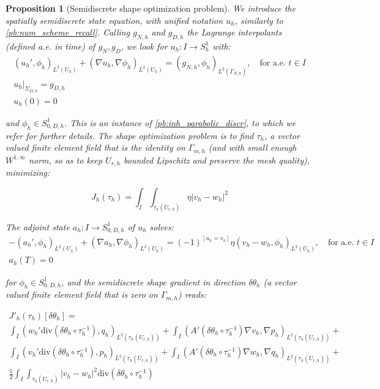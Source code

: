 \documentclass[english,a4paper,9pt,oneside]{scrbook}	%
\theoremstyle{break}
\newtheorem{prop}[equation]{Proposition}
\theoremstyle{remark}
\newcommand{\te}{\theta}
\newcommand{\dive}{\text{div}}
\begin{document}
\begin{prop}[Semidiscrete shape optimization problem]
\label{prop:sd_shopt}
We introduce the spatially semidiscrete state equation, with unified notation $u_h$, similarly to \cref{pb:num_scheme_recall}. Calling $g_{N,h}$ and $g_{D,h}$ the Lagrange interpolants (defined a.e. in time) of $g_N, g_D$, we look for $u_h:I \rightarrow S^1_h$ with:
\begin{align*}
\left ( u_h', \phi_h\right)_{L^2(U_h)} + (\nabla u_h, \nabla \phi_h)_{L^2(U_h)} = (g_{N,h} , \phi_h)_{L^2(\Gamma_{N,h})}, \quad \text{for a.e. } t \in I\\
u_h|_{\Sigma_{D,h}}=g_{D,h}\\
u_h(0)=0
\end{align*}

and $\phi_h \in S^1_{0,D,h}$. This is an instance of \cref{pb:inh_parabolic_discr}, to which we refer for further details. The shape optimization problem is to find $\tau_h$, a vector valued finite element field that is the identity on $\Gamma_{m,h}$ (and with small enough $W^{1,\infty}$ norm, so as to keep $U_{r,h}$ bounded Lipschitz and preserve the mesh quality), minimizing:

$$J_h(\tau_h)=\int_I\int_{\tau_h(U_{r,h})}\eta |v_h-w_h|^2$$

The adjoint state $a_h:I \rightarrow  S^1_{0,D,h}$ of $u_h$ solves:
\begin{align*}
-\left ( a_h', \phi_h\right)_{L^2(U_h)} + (\nabla a_h, \nabla \phi_h)_{L^2(U_h)} = (-1)^{\left [ u_h=v_h\right ]}\eta(v_h-w_h, \phi_h)_{L^2(U_h)}, \quad \text{for a.e. } t \in I\\
a_h(T)=0
\end{align*}

for $\phi_h \in S^1_{0,D,h}$, and the semidiscrete shape gradient in direction $\delta \te_h$ (a vector valued finite element field that is zero on $\Gamma_{m,h}$) reads:

\begin{align*} 
	J'_h(\tau_h)[\delta \te_h] =\\ \int_I (w_h' \dive(\delta \te_h\circ  \tau_h^{-1}), q_h )_{L^2(\tau_h(U_{r,h}))}+ \int_I (A'(\delta\te_h \circ \tau_h^{-1})\nabla v_h, \nabla p_h)_{L^2(\tau_h(U_{r,h}))}+\\
\int_I (v_h' \dive(\delta \te_h\circ  \tau_h^{-1}), p_h )_{L^2(\tau_h(U_{r,h}))}+ \int_I (A'(\delta\te_h \circ \tau_h^{-1})\nabla w_h, \nabla q_h)_{L^2(\tau_h(U_{r,h}))}+\\
\frac{1}{2}\int_I\int_{\tau_h(U_{r,h})}|v_h-w_h|^2\dive(\delta \te_h\circ  \tau_h^{-1})
\end{align*}

\end{prop}
\end{document}
